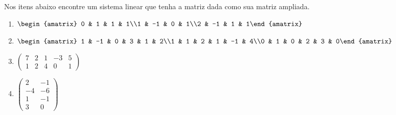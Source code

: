 \documentclass[12pt]{exam}
\begin{document}
\begin{exercicio}
  Nos itens abaixo encontre um sistema linear que tenha a matriz dada como sua matriz ampliada.
  \begin{multicols}{2}
    \begin{enumerate}
      \item $\begin{amatrix}{3}0 & 1 & 1 & 1\\1 & -1 & 0 & 1\\2 & -1 & 1 & 1\end{amatrix}$
      \item $\begin{amatrix}{5}1 & -1 & 0 & 3 & 1 & 2\\1 & 1 & 2 & 1 & -1 & 4\\0 & 1 & 0 & 2 & 3 & 0\end{amatrix}$
      \item $\begin{pmatrix}7 & 2 & 1 & -3 & 5\\1 & 2 & 4 & 0 & 1\end{pmatrix}$
      \item $\begin{pmatrix}2 & -1 \\ -4 & -6\\ 1 & -1\\3 & 0\end{pmatrix}$
    \end{enumerate}
  \end{multicols}
\end{exercicio}
\end{document}
